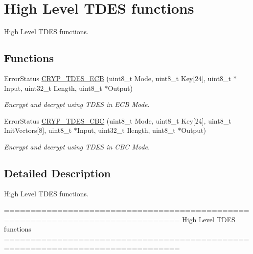 \hypertarget{group___c_r_y_p___group7}{\section{High Level T\-D\-E\-S functions}
\label{group___c_r_y_p___group7}
}


High Level T\-D\-E\-S functions.  


\subsection*{Functions}
\begin{DoxyCompactItemize}
\item 
Error\-Status \hyperlink{group___c_r_y_p___group7_ga17c03ab4f0566fcbc3dd8c052e6f9886}{C\-R\-Y\-P\-\_\-\-T\-D\-E\-S\-\_\-\-E\-C\-B} (uint8\-\_\-t Mode, uint8\-\_\-t Key\mbox{[}24\mbox{]}, uint8\-\_\-t $\ast$Input, uint32\-\_\-t Ilength, uint8\-\_\-t $\ast$Output)
\begin{DoxyCompactList}\small\item\em Encrypt and decrypt using T\-D\-E\-S in E\-C\-B Mode. \end{DoxyCompactList}\item 
Error\-Status \hyperlink{group___c_r_y_p___group7_gabe52a368c4882450c1e82f16bc1eb686}{C\-R\-Y\-P\-\_\-\-T\-D\-E\-S\-\_\-\-C\-B\-C} (uint8\-\_\-t Mode, uint8\-\_\-t Key\mbox{[}24\mbox{]}, uint8\-\_\-t Init\-Vectors\mbox{[}8\mbox{]}, uint8\-\_\-t $\ast$Input, uint32\-\_\-t Ilength, uint8\-\_\-t $\ast$Output)
\begin{DoxyCompactList}\small\item\em Encrypt and decrypt using T\-D\-E\-S in C\-B\-C Mode. \end{DoxyCompactList}\end{DoxyCompactItemize}


\subsection{Detailed Description}
High Level T\-D\-E\-S functions. \begin{DoxyVerb} ===============================================================================
                          High Level TDES functions
 ===============================================================================\end{DoxyVerb}
 

